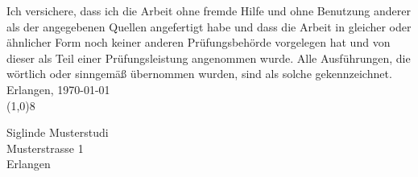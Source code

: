 \vspace*{1cm}
%

Ich versichere, dass ich die Arbeit ohne fremde Hilfe und ohne
Benutzung anderer als der angegebenen Quellen angefertigt habe und
dass die Arbeit in gleicher oder \"{a}hnlicher Form noch keiner
anderen Pr\"{u}fungsbeh\"{o}rde vorgelegen hat und von dieser als
Teil einer Pr\"{u}fungsleistung angenommen wurde. Alle
Ausf\"{u}hrungen, die w\"{o}rtlich oder sinngem\"{a}{\ss}
\"{u}bernommen wurden, sind als solche
gekennzeichnet.\\[30mm]
%
Erlangen, \today\\[20mm]
%
\line(1,0){8}\\[2mm]
\hspace*{25mm}
\parbox[h]{80mm}{%
  \small
  Siglinde Musterstudi\\
  Musterstrasse 1\\
  Erlangen}
